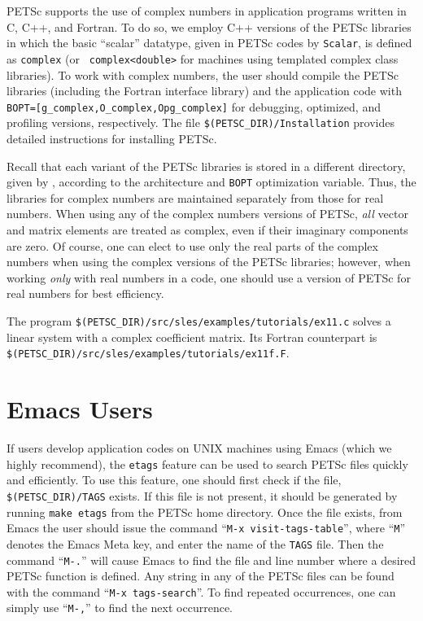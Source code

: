 PETSc supports the use of complex numbers in application programs
written in C, C++, and Fortran.  To do so, we employ C++ versions of
the PETSc libraries in which the basic ``scalar'' datatype, given in
PETSc codes by {\tt Scalar}, is defined as {\tt complex} (or {\tt
complex<double>} for machines using templated complex class
libraries).  To work with complex numbers,
the user should compile the PETSc libraries (including the Fortran
interface library) and the application code with
{\tt BOPT=[g\_complex,O\_complex,Opg\_complex]} for debugging, optimized,
and profiling versions, respectively.  The file {\tt \$(PETSC\_DIR)/Installation}
provides detailed instructions for installing PETSc.

Recall that each variant of the PETSc libraries is stored in a
different directory, given by
, according to the
architecture and {\tt BOPT} optimization variable.  Thus, the libraries for complex
numbers are maintained separately from those for real
numbers.  When using any of the complex numbers versions of PETSc,
{\em all} vector and matrix elements are treated as complex,
even if their imaginary components are zero.
Of course, one can elect to use only the real parts of the complex
numbers when using the complex versions of the PETSc libraries;
however, when working {\em only} with real numbers in a code,
one should use a version of PETSc for real numbers for best efficiency.

The program {\tt \$(PETSC\_DIR)/src/sles/examples/tutorials/ex11.c}
solves a linear system with a complex
coefficient matrix.  Its Fortran counterpart is
{\tt \$(PETSC\_DIR)/src/sles/examples/tutorials/ex11f.F}.

\section{Emacs Users}  \label{sec:emacs}

If users develop  
application codes on UNIX machines using Emacs (which we
highly recommend), the {\tt etags} feature can be used to search PETSc 
files quickly and efficiently.  To use this feature, one should 
first check if the file,
{\tt \$(PETSC\_DIR)/TAGS} exists.  If this file is
not present, it should be generated by
running {\tt make etags} from the PETSc home directory. 
Once the file exists, from 
Emacs the user should issue
the command ``{\tt M-x visit-tags-table}'', where ``{\tt M}''
denotes the Emacs Meta key, and enter the 
name of the {\tt TAGS} file. Then the command ``{\tt M-.}'' will cause Emacs 
to find the file and line number where a desired PETSc function 
is defined.  Any string in any of the PETSc files can be found with the 
command ``{\tt M-x tags-search}''. To find repeated occurrences, 
one can simply use ``{\tt M-,}'' to find the next occurrence.

